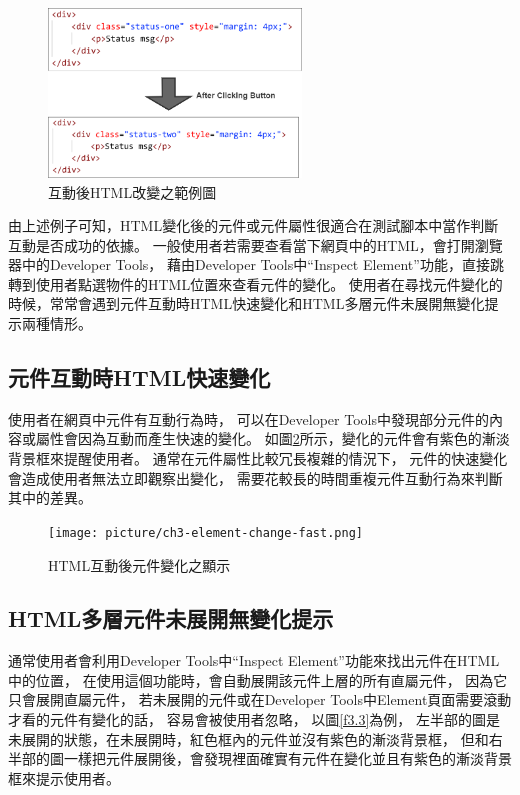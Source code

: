 \begin{figure}[H]
    \centering
    \includegraphics[width=0.6\textwidth]{picture/ch3-html-after-change.png}
    \caption{互動後HTML改變之範例圖}
    \label{f3.1}
\end{figure}

由上述例子可知，HTML變化後的元件或元件屬性很適合在測試腳本中當作判斷互動是否成功的依據。
一般使用者若需要查看當下網頁中的HTML，會打開瀏覽器中的Developer Tools，
藉由Developer Tools中``Inspect Element''功能，直接跳轉到使用者點選物件的HTML位置來查看元件的變化。
使用者在尋找元件變化的時候，常常會遇到元件互動時HTML快速變化和HTML多層元件未展開無變化提示兩種情形。

\subsection{元件互動時HTML快速變化}\label{s3.1.2}

使用者在網頁中元件有互動行為時，
可以在Developer Tools中發現部分元件的內容或屬性會因為互動而產生快速的變化。
如圖\ref{f3.2}所示，變化的元件會有紫色的漸淡背景框來提醒使用者。
通常在元件屬性比較冗長複雜的情況下，
元件的快速變化會造成使用者無法立即觀察出變化，
需要花較長的時間重複元件互動行為來判斷其中的差異。

\begin{figure}[H]
    \centering
    \texttt{[image: picture/ch3-element-change-fast.png]}
    \caption{HTML互動後元件變化之顯示}
    \label{f3.2}
\end{figure}

\subsection{HTML多層元件未展開無變化提示}\label{s3.1.3}

通常使用者會利用Developer Tools中``Inspect Element''功能來找出元件在HTML中的位置，
在使用這個功能時，會自動展開該元件上層的所有直屬元件，
因為它只會展開直屬元件，
若未展開的元件或在Developer Tools中Element頁面需要滾動才看的元件有變化的話，
容易會被使用者忽略，
以圖\ref{f3.3}為例，
左半部的圖是未展開的狀態，在未展開時，紅色框內的元件並沒有紫色的漸淡背景框，
但和右半部的圖一樣把元件展開後，會發現裡面確實有元件在變化並且有紫色的漸淡背景框來提示使用者。

